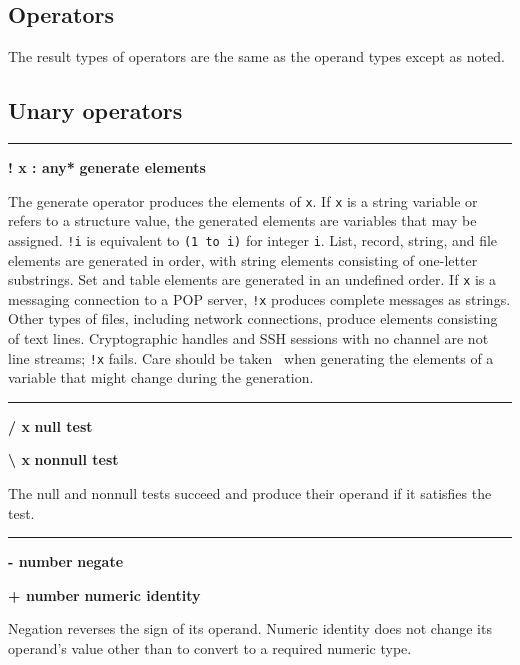 \subsection*{Operators}

The result types of operators are the same as the
operand types except as noted.

\subsection*{Unary operators}

\bigskip\hrule\vspace{0.1cm}
\noindent
{\bf ! x : any* } \hfill {\bf generate elements}

\noindent
{}The generate
operator produces the elements of \texttt{x}. If
\texttt{x} is a string variable or refers to a structure value, the
generated elements are variables that may be assigned. \texttt{!i} is
equivalent to \texttt{(1 to i)} for integer \texttt{i}. List, record,
string, and file elements are generated in order, with string elements
consisting of one-letter substrings. Set and table elements are
generated in an undefined order. If \texttt{x} is a messaging
connection to a POP server, \texttt{!x} produces complete messages as
strings. Other types of files, including network connections, produce
elements consisting of text lines. Cryptographic handles and SSH
sessions with no channel are not line streams; \texttt{!x} fails.
Care should be taken \WarningNotThreadSafe\ when generating the elements
of a variable that might change during the generation.

\bigskip\hrule\vspace{0.1cm}
\noindent
{\bf / x } \hfill {\bf null test}

\noindent
{\bf {\textbackslash} x } \hfill {\bf nonnull test}

\noindent
The null and nonnull tests succeed
and produce their operand if it satisfies the test.

\bigskip\hrule\vspace{0.1cm}
\noindent
{\bf {}- number } \hfill {\bf negate}

\noindent
{\bf + number } \hfill {\bf numeric identity}

\noindent
Negation reverses the sign of its operand. Numeric identity does not
change its operand's value other than to convert to a
required numeric type.

